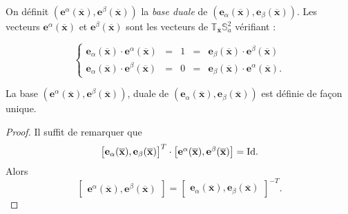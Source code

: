 \begin{definition}
On définit $(\mathbf{e}^{\alpha}(\overline{\mathbf{x}}), \mathbf{e}^{\beta}(\overline{\mathbf{x}}))$ la \textit{base duale} de $(\mathbf{e}_{\alpha}(\overline{\mathbf{x}}), \mathbf{e}_{\beta}(\overline{\mathbf{x}}))$.
Les vecteurs $\mathbf{e}^{\alpha}(\overline{\mathbf{x}})$ et $\mathbf{e}^{\beta}(\overline{\mathbf{x}})$ sont les vecteurs de $\mathbb{T}_{\overline{\mathbf{x}}}\mathbb{S}_a^2$ vérifiant :

\begin{equation}
\left\lbrace
\begin{array}{rcccl}
\mathbf{e}_{\alpha}(\overline{\mathbf{x}}) \cdot \mathbf{e}^{\alpha}(\overline{\mathbf{x}}) & = & 1 & = & \mathbf{e}_{\beta}(\overline{\mathbf{x}}) \cdot \mathbf{e}^{\beta}(\overline{\mathbf{x}}) \\
\mathbf{e}_{\alpha}(\overline{\mathbf{x}}) \cdot \mathbf{e}^{\beta}(\overline{\mathbf{x}}) & = & 0 & = & \mathbf{e}_{\beta}(\overline{\mathbf{x}}) \cdot \mathbf{e}^{\alpha}(\overline{\mathbf{x}}).
\end{array}
\right.
\label{eq: dualite alpha beta}
\end{equation}
\end{definition}

\begin{proposition}
La base $(\mathbf{e}^{\alpha}(\overline{\mathbf{x}}), \mathbf{e}^{\beta}(\overline{\mathbf{x}}))$, duale de $(\mathbf{e}_{\alpha}(\overline{\mathbf{x}}), \mathbf{e}_{\beta}(\overline{\mathbf{x}}))$ est définie de façon unique.
\end{proposition}

\begin{proof}
Il suffit de remarquer que
\begin{equation}
\begin{bmatrix}
\mathbf{e}_{\alpha}(\overline{\mathbf{x}}) , \mathbf{e}_{\beta}(\overline{\mathbf{x}})
\end{bmatrix}^T \cdot 
\begin{bmatrix}
\mathbf{e}^{\alpha}(\overline{\mathbf{x}}) , \mathbf{e}^{\beta}(\overline{\mathbf{x}})
\end{bmatrix} = \text{Id}.
\end{equation}
Alors 
\begin{equation}
\begin{bmatrix}
\mathbf{e}^{\alpha}(\overline{\mathbf{x}}) , \mathbf{e}^{\beta}(\overline{\mathbf{x}})
\end{bmatrix} = 
\begin{bmatrix}
\mathbf{e}_{\alpha}(\overline{\mathbf{x}}) , \mathbf{e}_{\beta}(\overline{\mathbf{x}})
\end{bmatrix}^{-T}.
\end{equation}
\end{proof}

